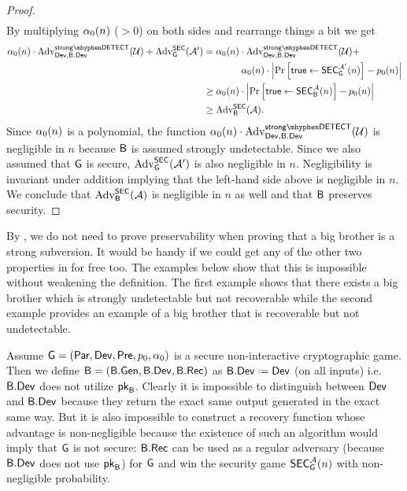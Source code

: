 \begin{proof}
\begin{align*}
\end{align*}
By multiplying $\alpha_{0}(n)$ ($>0$) on both sides and rearrange things a bit we get
\begin{align*}
\secf(n)\cdot\adv_{\dev,\bbdev}^{\strongdetectplain}(\user) + \adv_{\cgame}^{\secgame}(\adve') &= \secf(n)\cdot \adv_{\dev,\bbdev}^{\strongdetectplain}(\user) + \\ 
&\qquad\qquad\secf(n)\cdot\left\vert \prob{\true \leftarrow \secgame_{\cgame}^{\adve'}(n)} - \basep(n) \right\vert \\ 
& \geq \secf(n)\cdot \left\vert \prob{ \true\leftarrow \secgame_{\bb}^{\adve}(n)} - \basep(n)\right\vert \\
& \geq \adv_{\bb}^{\secgame}(\adve).
\end{align*}
Since $\alpha_{0}(n)$ is a polynomial, the function $\secf(n)\cdot\adv_{\dev,\bbdev}^{\strongdetectplain}(\user)$ is negligible in $n$ because $\mathsf{B}$ is assumed strongly undetectable. Since we also assumed that $\operatorname{\mathsf{G}}$ is secure, $\operatorname{Adv}_{\operatorname{\mathsf{G}}}^{\mathsf{SEC}}(\mathcal{A}')$ is also negligible in $n$. Negligibility is invariant under addition implying that the left-hand side above is negligible in $n$. We conclude that $\operatorname{Adv}_{\mathsf{B}}^{\mathsf{SEC}}(\mathcal{A})$ is negligible in $n$ as well and that $\mathsf{B}$ preserves security.
\end{proof}

By , we do not need to prove preservability when proving that a big brother is a strong subversion. It would be handy if we could get any of the other two properties in  for free too. The examples below show that this is impossible without weakening the definition. The first example shows that there exists a big brother which is strongly undetectable but not recoverable while the second example provides an example of a big brother that is recoverable but not undetectable.

\begin{ex}
Assume $\operatorname{\mathsf{G}}=\left(\operatorname{\mathsf{Par}},\operatorname{\mathsf{Dev}},\operatorname{\mathsf{Pre}},p_{0},\alpha_{0}\right)$ is a secure non-interactive cryptographic game. Then we define $\mathsf{B} = \left(\mathsf{B}.\mathsf{Gen},\mathsf{B}.\mathsf{Dev},\mathsf{B}.\mathsf{Rec}\right)$ as $\bbdev \defeq \dev$ (on all inputs) i.e. $\mathsf{B}.\mathsf{Dev}$ does not utilize $\mathsf{pk}_{\mathsf{B}}$. Clearly it is impossible to distinguish between $\operatorname{\mathsf{Dev}}$ and $\mathsf{B}.\mathsf{Dev}$ because they return the exact same output generated in the exact same way. But it is also impossible to construct a recovery function whose advantage is non-negligible because the existence of such an algorithm would imply that $\operatorname{\mathsf{G}}$ is not secure: $\mathsf{B}.\mathsf{Rec}$ can be used as a regular adversary (because $\mathsf{B}.\mathsf{Dev}$ does not use $\mathsf{pk}_{\mathsf{B}}$) for $\operatorname{\mathsf{G}}$ and win the security game $\mathsf{SEC}_{\operatorname{\mathsf{G}}}^{\mathcal{A}}(n)$ with non-negligible probability.
\end{ex}

